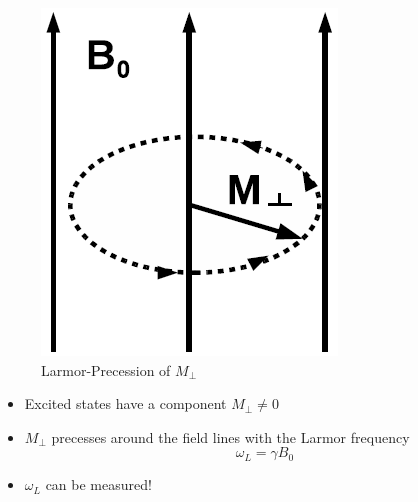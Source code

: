 \documentclass[aspectratio=169]{beamer}
\begin{document}
\begin{frame}
\begin{minipage}[t]{\textwidth}
\begin{minipage}[t]{0.3\textwidth}
\begin{figure}
				\includegraphics[height=0.3\textheight]{./Resources/larmor_precession.png}
				\caption{Larmor-Precession of $M_{\perp}$}
				\label{fig:larmor}
			\end{figure}
		\end{minipage}
		\begin{minipage}[t]{0.65\textwidth}
			\begin{itemize}
				\item Excited states have a component $M_{\perp} \neq 0$
				\item $M_{\perp}$ precesses around the field lines with the Larmor frequency
				\begin{equation}
					\omega_L = \gamma B_0
				\end{equation}
				\item $\omega_L$ can be measured!				
			\end{itemize}
		\end{minipage}
	\end{minipage}

\end{frame}
\end{document}
